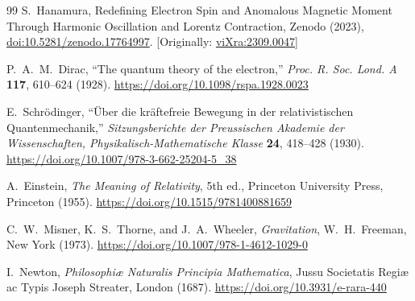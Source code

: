 \documentclass[%
 reprint,
 amsmath,amssymb,
 aps,
]{revtex4-1}
\numberwithin{equation}{section}%
\begin{document}
\begin{thebibliography}{99}
S.~Hanamura, Redefining Electron Spin and Anomalous Magnetic Moment Through Harmonic Oscillation and Lorentz Contraction, Zenodo (2023), \href{https://doi.org/10.5281/zenodo.17764997}{doi:10.5281/zenodo.17764997}. [Originally: \href{https://vixra.org/abs/2309.0047}{viXra:2309.0047}]

P.~A.~M.~Dirac, 
``The quantum theory of the electron,'' 
\textit{Proc. R. Soc. Lond. A} \textbf{117}, 610--624 (1928). 
\href{https://doi.org/10.1098/rspa.1928.0023}{https://doi.org/10.1098/rspa.1928.0023}

E.~Schrödinger, 
``Über die kräftefreie Bewegung in der relativistischen Quantenmechanik,'' 
\textit{Sitzungsberichte der Preussischen Akademie der Wissenschaften, Physikalisch-Mathematische Klasse} \textbf{24}, 418--428 (1930).
\href{https://doi.org/10.1007/978-3-662-25204-5_38}{https://doi.org/10.1007/978-3-662-25204-5\_38}

A.~Einstein, 
\textit{The Meaning of Relativity}, 
5th ed., Princeton University Press, Princeton (1955).
\href{https://doi.org/10.1515/9781400881659}{https://doi.org/10.1515/9781400881659}

C.~W.~Misner, K.~S.~Thorne, and J.~A.~Wheeler, 
\textit{Gravitation}, 
W.~H.~Freeman, New York (1973).
\href{https://doi.org/10.1007/978-1-4612-1029-0}{https://doi.org/10.1007/978-1-4612-1029-0}

I.~Newton, 
\textit{Philosophiæ Naturalis Principia Mathematica}, 
Jussu Societatis Regiæ ac Typis Joseph Streater, London (1687).
\href{https://doi.org/10.3931/e-rara-440}{https://doi.org/10.3931/e-rara-440}


\end{thebibliography}
\end{document}

